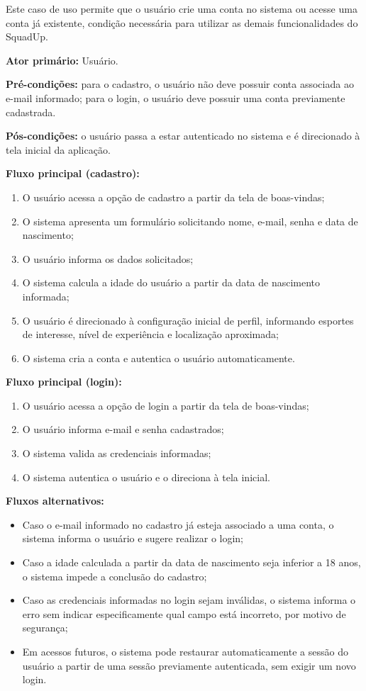 \documentclass[a4paper, 12pt]{article}
\begin{document}
\begin{justify}
Este caso de uso permite que o usuário crie uma conta no sistema ou acesse uma conta já existente, condição necessária para utilizar as demais funcionalidades do SquadUp.

\textbf{Ator primário:} Usuário.

\textbf{Pré-condições:} para o cadastro, o usuário não deve possuir conta associada ao e-mail informado; para o login, o usuário deve possuir uma conta previamente cadastrada.

\textbf{Pós-condições:} o usuário passa a estar autenticado no sistema e é direcionado à tela inicial da aplicação.

\textbf{Fluxo principal (cadastro):}

\begin{enumerate}
    \item O usuário acessa a opção de cadastro a partir da tela de boas-vindas;
    \item O sistema apresenta um formulário solicitando nome, e-mail, senha e data de nascimento;
    \item O usuário informa os dados solicitados;
    \item O sistema calcula a idade do usuário a partir da data de nascimento informada;
    \item O usuário é direcionado à configuração inicial de perfil, informando esportes de interesse, nível de experiência e localização aproximada;
    \item O sistema cria a conta e autentica o usuário automaticamente.
\end{enumerate}

\textbf{Fluxo principal (login):}

\begin{enumerate}
    \item O usuário acessa a opção de login a partir da tela de boas-vindas;
    \item O usuário informa e-mail e senha cadastrados;
    \item O sistema valida as credenciais informadas;
    \item O sistema autentica o usuário e o direciona à tela inicial.
\end{enumerate}

\textbf{Fluxos alternativos:}

\begin{itemize}
    \item Caso o e-mail informado no cadastro já esteja associado a uma conta, o sistema informa o usuário e sugere realizar o login;
    \item Caso a idade calculada a partir da data de nascimento seja inferior a 18 anos, o sistema impede a conclusão do cadastro;
    \item Caso as credenciais informadas no login sejam inválidas, o sistema informa o erro sem indicar especificamente qual campo está incorreto, por motivo de segurança;
    \item Em acessos futuros, o sistema pode restaurar automaticamente a sessão do usuário a partir de uma sessão previamente autenticada, sem exigir um novo login.
\end{itemize}


\end{justify}
\end{document}
